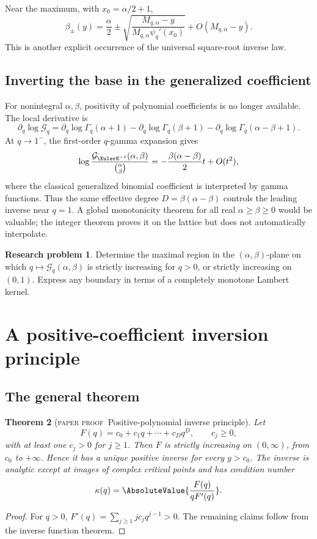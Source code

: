 \documentclass[11pt,oneside]{article}
\newtheorem{theorem}{Theorem}[section]
\theoremstyle{definition}
\theoremstyle{remark}
\theoremstyle{plain}
\theoremstyle{definition}
\newtheorem{researchproblem}[theorem]{Research problem}
\theoremstyle{remark}
\newcommand{\statusproved}{\textcolor{provedgreen}{\textsc{paper proof}}}
\numberwithin{equation}{section}
\numberwithin{figure}{section}
\numberwithin{table}{section}
\let\reporttopsection\section
\let\reportsubsection\subsection
\let\reportsubsubsection\subsubsection
\let\chapter\reporttopsection
\let\section\reportsubsection
\let\subsection\reportsubsubsection
\begin{document}
Near the maximum, with \(x_0=\alpha/2+1\),
\begin{equation}
 \beta_\pm(y)=\frac\alpha2
 \pm\sqrt{\frac{M_{q,\alpha}-y}
 {M_{q,\alpha}\psi_q'(x_0)}}
 +O(M_{q,\alpha}-y).
 \label{eq:beta-branches-max}
\end{equation}
This is another explicit occurrence of the universal square-root inverse law.

\section{Inverting the base in the generalized coefficient}
For nonintegral \(\alpha,\beta\), positivity of polynomial coefficients is no
longer available.  The local derivative is
\[
 \partial_q\log\mathcal G_q
 =\partial_q\log\Gamma_q(\alpha+1)
 -\partial_q\log\Gamma_q(\beta+1)
 -\partial_q\log\Gamma_q(\alpha-\beta+1).
\]
At \(q\to1^-\), the first-order \(q\)-gamma expansion gives
\begin{equation}
 \log\frac{\mathcal G_{\EulerE^{-t}}(\alpha,\beta)}
 {\binom{\alpha}{\beta}}
 =-\frac{\beta(\alpha-\beta)}2t+O(t^2),
 \label{eq:generalized-qbinom-q1}
\end{equation}
where the classical generalized binomial coefficient is interpreted by gamma
functions.  Thus the same effective degree \(D=\beta(\alpha-\beta)\) controls
the leading inverse near \(q=1\).  A global monotonicity theorem for all real
\(\alpha\ge\beta\ge0\) would be valuable; the integer theorem proves it on the
lattice but does not automatically interpolate.

\begin{researchproblem}
Determine the maximal region in the \((\alpha,\beta)\)-plane on which
\(q\mapsto\mathcal G_q(\alpha,\beta)\) is strictly increasing for \(q>0\), or
strictly increasing on \((0,1)\).  Express any boundary in terms of a completely
monotone Lambert kernel.
\end{researchproblem}

\chapter{A positive-coefficient inversion principle}

\section{The general theorem}
\begin{theorem}[\statusproved\ Positive-polynomial inverse principle]
Let
\[
 F(q)=c_0+c_1q+\cdots+c_Dq^D,
 \qquad c_j\ge0,
\]
with at least one \(c_j>0\) for \(j\ge1\).  Then \(F\) is strictly increasing
on \((0,\infty)\), from \(c_0\) to \(+\infty\).  Hence it has a unique positive
inverse for every \(y>c_0\).  The inverse is analytic except at images of
complex critical points and has condition number
\[
 \kappa(q)=\AbsoluteValue{\frac{F(q)}{qF'(q)}}.
\]
\end{theorem}
\begin{proof}
For \(q>0\), \(F'(q)=\sum_{j\ge1}jc_jq^{j-1}>0\).  The remaining claims follow
from the inverse function theorem.
\end{proof}
\end{document}
